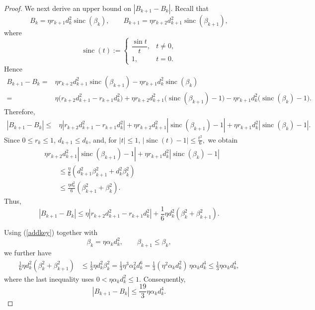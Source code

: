 \documentclass[10pt,a4paper]{amsart}
\DeclareMathOperator{\sinc}{sinc}
\begin{document}
\begin{proof}
We next derive an upper bound on $|B_{k+1}-B_k|$. Recall that
\[
B_k=\eta r_{k+1}d_k^2\sinc(\beta_k),
\qquad
B_{k+1}=\eta r_{k+2}d_{k+1}^2\sinc(\beta_{k+1}),
\]
where
\[
\sinc(t):=
\begin{cases}
\dfrac{\sin t}{t}, & t\neq 0,\\[1mm]
1, & t=0.
\end{cases}
\]
Hence
\begin{align*}
B_{k+1}-B_k
={}&
\eta r_{k+2}d_{k+1}^2\sinc(\beta_{k+1})
-\eta r_{k+1}d_k^2\sinc(\beta_k)\\
={}&
\eta\bigl(r_{k+2}d_{k+1}^2-r_{k+1}d_k^2\bigr)
+\eta r_{k+2}d_{k+1}^2
   \bigl(\sinc(\beta_{k+1})-1\bigr)
-\eta r_{k+1}d_k^2
   \bigl(\sinc(\beta_k)-1\bigr).
\end{align*}
Therefore,
\begin{align*}
|B_{k+1}-B_k|
\le{}&
\eta\left|r_{k+2}d_{k+1}^2-r_{k+1}d_k^2\right|+
\eta r_{k+2}d_{k+1}^2
\left|\sinc(\beta_{k+1})-1\right|+
\eta r_{k+1}d_k^2
\left|\sinc(\beta_k)-1\right|.
\end{align*}
Since \(0\le r_k\le 1\), \(d_{k+1}\le d_k\), and, for \(|t|\le 1\),
$
|\sinc(t)-1|\le \frac{t^2}{6},
$
we obtain
\begin{align*}
&\eta r_{k+2}d_{k+1}^2
\left|\sinc(\beta_{k+1})-1\right|
+
\eta r_{k+1}d_k^2
\left|\sinc(\beta_k)-1\right|\\
&\qquad\le
\frac{\eta}{6}
\left(
d_{k+1}^2\beta_{k+1}^2+d_k^2\beta_k^2
\right)\\
&\qquad\le
\frac{\eta d_k^2}{6}
\left(
\beta_{k+1}^2+\beta_k^2
\right).
\end{align*}
Thus,
\[
|B_{k+1}-B_k|
\le
\eta\left|r_{k+2}d_{k+1}^2-r_{k+1}d_k^2\right|
+
\frac{1}{6}\eta d_k^2
\left(\beta_k^2+\beta_{k+1}^2\right).
\]

Using (\ref{addkey})
together with
\[
\beta_k=\eta\alpha_kd_k^2,
\qquad
\beta_{k+1}\le\beta_k,
\]
we further have
\begin{align*}
\frac{1}{6}\eta d_k^2(\beta_k^2+\beta_{k+1}^2)
&\le
\frac{1}{3}\eta d_k^2\beta_k^2=
\frac{1}{3}\eta^3\alpha_k^2d_k^6=
\frac{1}{3}(\eta^2\alpha_kd_k^2)\,
\eta\alpha_kd_k^4\le
\frac{1}{3}\eta\alpha_kd_k^4,
\end{align*}
where the last inequality uses
\(0<\eta\alpha_kd_k^2\le1\). Consequently,
\[
|B_{k+1}-B_k|
\le
\frac{19}{3}\eta\alpha_kd_k^4.
\]




\end{proof}
\end{document}
